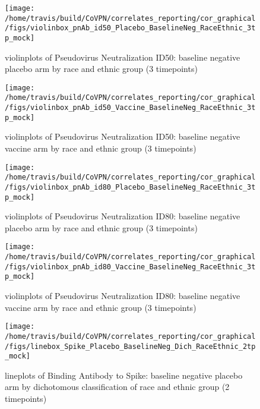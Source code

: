 \documentclass[]{book}
\theoremstyle{definition}
\theoremstyle{definition}
\theoremstyle{definition}
\newcommand{\1}{\mathbbm{1}}
\begin{document}
\clearpage
\begin{figure}[H]

{\centering \texttt{[image: /home/travis/build/CoVPN/correlates\_reporting/cor\_graphical/figs/violinbox\_pnAb\_id50\_Placebo\_BaselineNeg\_RaceEthnic\_3tp\_mock]} 

}

\caption{violinplots of Pseudovirus Neutralization ID50: baseline negative placebo arm by race and ethnic group (3 timepoints)}\label{fig:unnamed-chunk-215}
\end{figure}

\clearpage
\begin{figure}[H]

{\centering \texttt{[image: /home/travis/build/CoVPN/correlates\_reporting/cor\_graphical/figs/violinbox\_pnAb\_id50\_Vaccine\_BaselineNeg\_RaceEthnic\_3tp\_mock]} 

}

\caption{violinplots of Pseudovirus Neutralization ID50: baseline negative vaccine arm by race and ethnic group (3 timepoints)}\label{fig:unnamed-chunk-216}
\end{figure}

\clearpage
\begin{figure}[H]

{\centering \texttt{[image: /home/travis/build/CoVPN/correlates\_reporting/cor\_graphical/figs/violinbox\_pnAb\_id80\_Placebo\_BaselineNeg\_RaceEthnic\_3tp\_mock]} 

}

\caption{violinplots of Pseudovirus Neutralization ID80: baseline negative placebo arm by race and ethnic group (3 timepoints)}\label{fig:unnamed-chunk-217}
\end{figure}

\clearpage
\begin{figure}[H]

{\centering \texttt{[image: /home/travis/build/CoVPN/correlates\_reporting/cor\_graphical/figs/violinbox\_pnAb\_id80\_Vaccine\_BaselineNeg\_RaceEthnic\_3tp\_mock]} 

}

\caption{violinplots of Pseudovirus Neutralization ID80: baseline negative vaccine arm by race and ethnic group (3 timepoints)}\label{fig:unnamed-chunk-218}
\end{figure}

\clearpage
\begin{figure}[H]

{\centering \texttt{[image: /home/travis/build/CoVPN/correlates\_reporting/cor\_graphical/figs/linebox\_Spike\_Placebo\_BaselineNeg\_Dich\_RaceEthnic\_2tp\_mock]} 

}

\caption{lineplots of Binding Antibody to Spike: baseline negative placebo arm by dichotomous classification of race and ethnic group (2 timepoints)}\label{fig:unnamed-chunk-219}
\end{figure}
\end{document}
